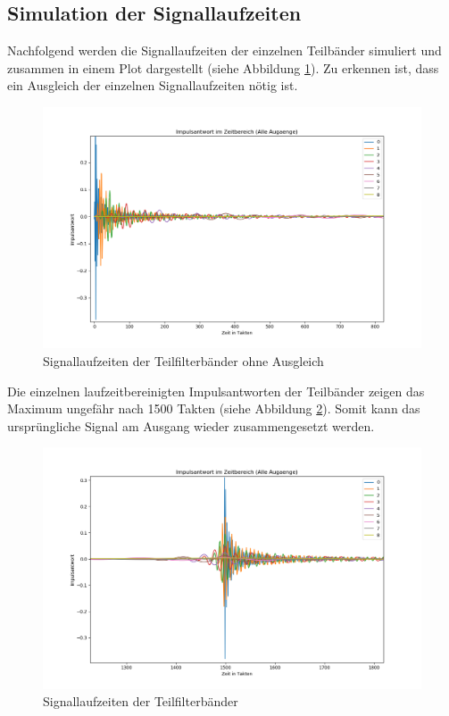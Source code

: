 \subsection{Simulation der Signallaufzeiten}
Nachfolgend werden die Signallaufzeiten der einzelnen Teilbänder simuliert und zusammen in einem Plot dargestellt (siehe Abbildung \ref{fig:TeilbandLaufzeitenohne}). Zu erkennen ist, dass ein Ausgleich der einzelnen Signallaufzeiten nötig ist.\par
\begin{figure}[h!]
	\centering	\includegraphics[width=15cm]{img/bank_zeit_alle_keinAusgleich.png}
	\caption{Signallaufzeiten der Teilfilterbänder ohne Ausgleich}
	\label{fig:TeilbandLaufzeitenohne}
\end{figure}
Die einzelnen laufzeitbereinigten Impulsantworten der Teilbänder zeigen das Maximum ungefähr nach 1500 Takten (siehe Abbildung \ref{fig:TeilbandLaufzeiten}). Somit kann das ursprüngliche Signal am Ausgang wieder zusammengesetzt werden.
\begin{figure}[h!]
	\centering	\includegraphics[width=15cm]{img/bank_zeit_alle.png}
	\caption{Signallaufzeiten der Teilfilterbänder}
	\label{fig:TeilbandLaufzeiten}
\end{figure}

